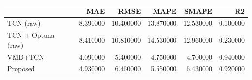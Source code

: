 \begin{tabular}{lrrrrr}
\toprule
 & MAE & RMSE & MAPE & SMAPE & R2 \\
\midrule
TCN (raw) & 8.390000 & 10.400000 & 13.870000 & 12.530000 & 0.100000 \\
TCN + Optuna (raw) & 8.410000 & 10.810000 & 14.530000 & 12.960000 & 0.230000 \\
VMD+TCN & 4.090000 & 5.400000 & 4.750000 & 4.700000 & 0.940000 \\
Proposed & 4.930000 & 6.450000 & 5.550000 & 5.430000 & 0.920000 \\
\bottomrule
\end{tabular}
